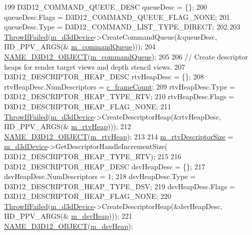 \begin{DoxyCode}
199     D3D12\_COMMAND\_QUEUE\_DESC queueDesc = \{\};
200     queueDesc.Flags = D3D12\_COMMAND\_QUEUE\_FLAG\_NONE;
201     queueDesc.Type = D3D12\_COMMAND\_LIST\_TYPE\_DIRECT;
202 
203     \mbox{\hyperlink{_direct_x_helper_8h_abca3eeca6b5772a1112e0a9a9e3d9013}{ThrowIfFailed}}(\mbox{\hyperlink{class_d_x_1_1_device_resources_ac883ca593d5c03fe20d5865cb033cee1}{m\_d3dDevice}}->CreateCommandQueue(&queueDesc, IID\_PPV\_ARGS(&
      \mbox{\hyperlink{class_d_x_1_1_device_resources_a0f0882523aa09b109f3a7bc05ff01f46}{m\_commandQueue}})));
204     \mbox{\hyperlink{_direct_x_helper_8h_aac0bf77e771c5756a028295b6400839f}{NAME\_D3D12\_OBJECT}}(\mbox{\hyperlink{class_d_x_1_1_device_resources_a0f0882523aa09b109f3a7bc05ff01f46}{m\_commandQueue}});
205 
206     \textcolor{comment}{// Create descriptor heaps for render target views and depth stencil views.}
207     D3D12\_DESCRIPTOR\_HEAP\_DESC rtvHeapDesc = \{\};
208     rtvHeapDesc.NumDescriptors = \mbox{\hyperlink{namespace_d_x_a13eecb6f150dc97fc5c7c8597377d0fb}{c\_frameCount}};
209     rtvHeapDesc.Type = D3D12\_DESCRIPTOR\_HEAP\_TYPE\_RTV;
210     rtvHeapDesc.Flags = D3D12\_DESCRIPTOR\_HEAP\_FLAG\_NONE;
211     \mbox{\hyperlink{_direct_x_helper_8h_abca3eeca6b5772a1112e0a9a9e3d9013}{ThrowIfFailed}}(\mbox{\hyperlink{class_d_x_1_1_device_resources_ac883ca593d5c03fe20d5865cb033cee1}{m\_d3dDevice}}->CreateDescriptorHeap(&rtvHeapDesc, IID\_PPV\_ARGS(&
      \mbox{\hyperlink{class_d_x_1_1_device_resources_a23433ca65c8264c961778b97a309ea6a}{m\_rtvHeap}})));
212     \mbox{\hyperlink{_direct_x_helper_8h_aac0bf77e771c5756a028295b6400839f}{NAME\_D3D12\_OBJECT}}(\mbox{\hyperlink{class_d_x_1_1_device_resources_a23433ca65c8264c961778b97a309ea6a}{m\_rtvHeap}});
213 
214     \mbox{\hyperlink{class_d_x_1_1_device_resources_adc2a1e5cbd63c54ad5a2836348a33cb8}{m\_rtvDescriptorSize}} = \mbox{\hyperlink{class_d_x_1_1_device_resources_ac883ca593d5c03fe20d5865cb033cee1}{m\_d3dDevice}}->GetDescriptorHandleIncrementSize(
      D3D12\_DESCRIPTOR\_HEAP\_TYPE\_RTV);
215 
216     D3D12\_DESCRIPTOR\_HEAP\_DESC dsvHeapDesc = \{\};
217     dsvHeapDesc.NumDescriptors = 1;
218     dsvHeapDesc.Type = D3D12\_DESCRIPTOR\_HEAP\_TYPE\_DSV;
219     dsvHeapDesc.Flags = D3D12\_DESCRIPTOR\_HEAP\_FLAG\_NONE;
220     \mbox{\hyperlink{_direct_x_helper_8h_abca3eeca6b5772a1112e0a9a9e3d9013}{ThrowIfFailed}}(\mbox{\hyperlink{class_d_x_1_1_device_resources_ac883ca593d5c03fe20d5865cb033cee1}{m\_d3dDevice}}->CreateDescriptorHeap(&dsvHeapDesc, IID\_PPV\_ARGS(&
      \mbox{\hyperlink{class_d_x_1_1_device_resources_a71a459331defc54ff1677609d8608997}{m\_dsvHeap}})));
221     \mbox{\hyperlink{_direct_x_helper_8h_aac0bf77e771c5756a028295b6400839f}{NAME\_D3D12\_OBJECT}}(\mbox{\hyperlink{class_d_x_1_1_device_resources_a71a459331defc54ff1677609d8608997}{m\_dsvHeap}});

\end{DoxyCode}
